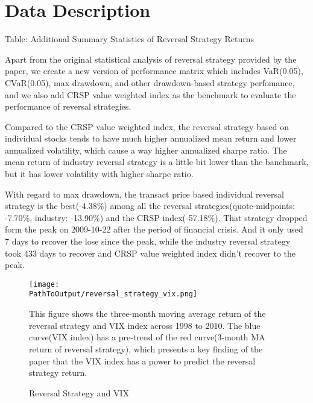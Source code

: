 \documentclass{article}
\newcommand*{\PathToOutput}{../output/}
\begin{document}
\section{Data Description}

\begin{landscape}
\begin{table}
    \centering
    \caption*{Table: Additional Summary Statistics of Reversal Strategy Returns}

    \raggedright
    \small
    Apart from the original statistical analysis of reversal strategy provided by 
    the paper, we create a new version of performance matrix which includes VaR(0.05), 
    CVaR(0.05), max drawdown, and other drawdown-based strategy perfomance, and we also 
    add CRSP value weighted index as the benchmark to evaluate the performance of reversal strategies. 

    Compared to the CRSP value weighted index, the reversal strategy based on individual 
    stocks tends to have much higher annualized mean return and lower annualized volatility, 
    which cause a way higher annualized sharpe ratio. The mean return of industry reversal 
    strategy is a little bit lower than the banchmark, but it has lower volatility 
    with higher sharpe ratio.

    With regard to max drawdown, the transact price based individual reversal strategy 
    is the best(-4.38\%) among all the reversal strategies(quote-midpoints: -7.70\%, 
    industry: -13.90\%) and the CRSP index(-57.18\%). That strategy dropped form the 
    peak on 2009-10-22 after the period of financial crisis. And it only used 7 days to 
    recover the lose since the peak, while the industry reversal strategy took 433 days 
    to recover and CRSP value weighted index didn't recover to the peak.
    \medskip

    \centering
    
\end{table}

\begin{figure}
    \centering
    \texttt{[image: \\PathToOutput/reversal\_strategy\_vix.png]}
    \caption{Reversal Strategy and VIX}

    \raggedright
    \medskip
    \small 
    This figure shows the three-month moving average return of the reversal strategy 
    and VIX index across 1998 to 2010. The blue curve(VIX index) has a pre-trend of 
    the red curve(3-month MA return of reversal strategy), which presents a key finding 
    of the paper that the VIX index has a power to predict the reversal strategy return.


\end{figure}
\end{landscape}
\end{document}
